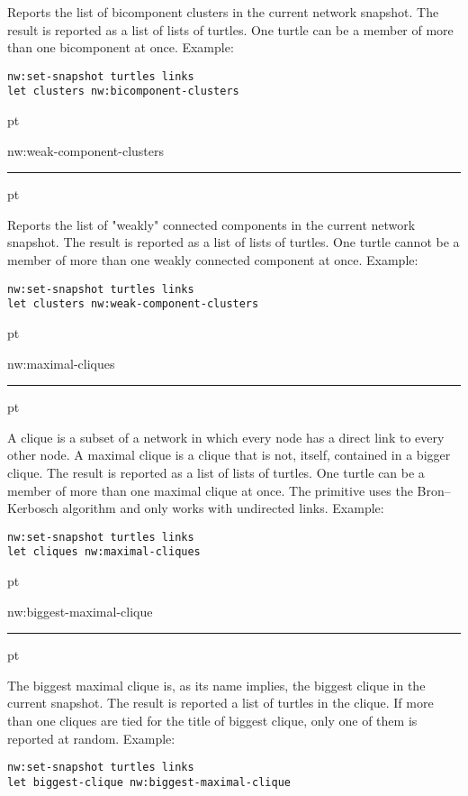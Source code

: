 \documentclass[12pt]{article}
\newenvironment{prim}{
  \leftskip 0cm
  \vskip 6 pt
  \ttfamily
  \bfseries
}{
  \hrule
  \vskip 6 pt
}
\begin{document}
Reports the list of bicomponent clusters in the current network snapshot. The
result is reported as a list of lists of turtles. One turtle can be a member of
more than one bicomponent at once. Example:

\begin{Verbatim}
nw:set-snapshot turtles links
let clusters nw:bicomponent-clusters
\end{Verbatim}

\begin{prim}
nw:weak-component-clusters
\end{prim}

Reports the list of "weakly" connected components in the current network
snapshot. The result is reported as a list of lists of turtles. One turtle
cannot be a member of more than one weakly connected component at once.
Example:

\begin{Verbatim}
nw:set-snapshot turtles links
let clusters nw:weak-component-clusters
\end{Verbatim}

\begin{prim}
nw:maximal-cliques
\end{prim}

A clique is a subset of a network in which every node has a direct link to every
other node. A maximal clique is a clique that is not, itself, contained in a
bigger clique. The result is reported as a list of lists of turtles. One turtle can be a member of more than one maximal clique at once. The
primitive uses the Bron–Kerbosch algorithm and only works with undirected links.
Example:
\begin{Verbatim}
nw:set-snapshot turtles links
let cliques nw:maximal-cliques
\end{Verbatim}

\begin{prim}
nw:biggest-maximal-clique
\end{prim}

The biggest maximal clique is, as its name implies, the biggest clique in the
current snapshot. The result is reported a list of turtles in the clique. If
more than one cliques are tied for the title of biggest clique, only one of them
is reported at random. Example:

\begin{Verbatim}
nw:set-snapshot turtles links
let biggest-clique nw:biggest-maximal-clique
\end{Verbatim}
\end{document}
